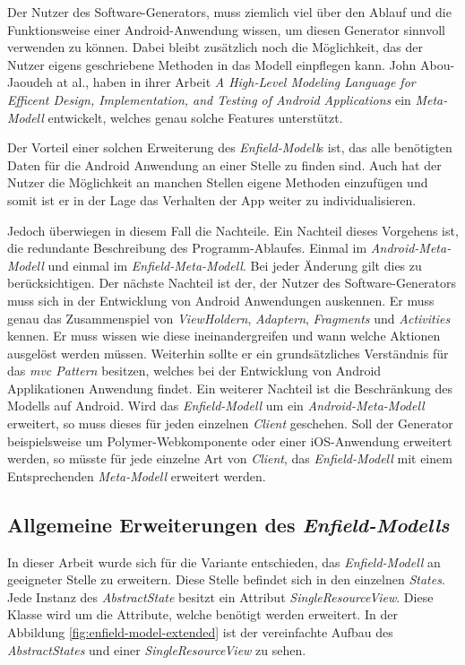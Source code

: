 Der Nutzer des Software-Generators, muss ziemlich viel über den Ablauf und die Funktionsweise einer Android-Anwendung wissen, um diesen Generator sinnvoll verwenden zu können.
Dabei bleibt zusätzlich noch die Möglichkeit, das der Nutzer eigens geschriebene Methoden in das Modell einpflegen kann. John Abou-Jaoudeh at al., haben in ihrer Arbeit \textit{A High-Level Modeling Language for Efficent Design, Implementation, and Testing of Android Applications}\cite{abou2015high} ein \textit{Meta-Modell} entwickelt, welches genau solche Features unterstützt.

Der Vorteil einer solchen Erweiterung des \textit{Enfield-Modell}s ist, das alle benötigten Daten für die Android Anwendung an einer Stelle zu finden sind. Auch hat der Nutzer die Möglichkeit an manchen Stellen eigene Methoden einzufügen und somit ist er in der Lage das Verhalten der App weiter zu individualisieren.

Jedoch überwiegen in diesem Fall die Nachteile. Ein Nachteil dieses Vorgehens ist, die redundante Beschreibung des Programm-Ablaufes. Einmal im \textit{Android-Meta-Modell} und einmal im \textit{Enfield-Meta-Modell}. Bei jeder Änderung gilt dies zu berücksichtigen. 
Der nächste Nachteil ist der, der Nutzer des Software-Generators muss sich in der Entwicklung von Android Anwendungen auskennen. Er muss genau das Zusammenspiel von \textit{ViewHoldern}, \textit{Adaptern}, \textit{Fragments} und \textit{Activities} kennen. Er muss wissen wie diese ineinandergreifen und wann welche Aktionen ausgelöst werden müssen. Weiterhin sollte er ein grundsätzliches Verständnis für das \textit{\acf{mvc} Pattern} besitzen, welches bei der Entwicklung von Android Applikationen Anwendung findet.
Ein weiterer Nachteil ist die Beschränkung des Modells auf Android. Wird das \textit{Enfield-Modell} um ein \textit{Android-Meta-Modell} erweitert, so muss dieses für jeden einzelnen \textit{Client} geschehen. Soll der Generator beispielsweise um Polymer-Webkomponente oder einer iOS-Anwendung erweitert werden, so müsste für jede einzelne Art von \textit{Client}, das \textit{Enfield-Modell} mit einem Entsprechenden \textit{Meta-Modell} erweitert werden.

\subsection{Allgemeine Erweiterungen des \textit{Enfield-Modells}}

In dieser Arbeit wurde sich für die Variante entschieden, das \textit{Enfield-Modell} an geeigneter Stelle zu erweitern.
Diese Stelle befindet sich in den einzelnen \textit{States}. Jede Instanz des \textit{AbstractState} besitzt ein Attribut \textit{SingleResourceView}. Diese Klasse wird um die  Attribute, welche benötigt werden erweitert. In der Abbildung \ref{fig:enfield-model-extended} ist der vereinfachte Aufbau des \textit{AbstractStates} und einer \textit{SingleResourceView} zu sehen.

